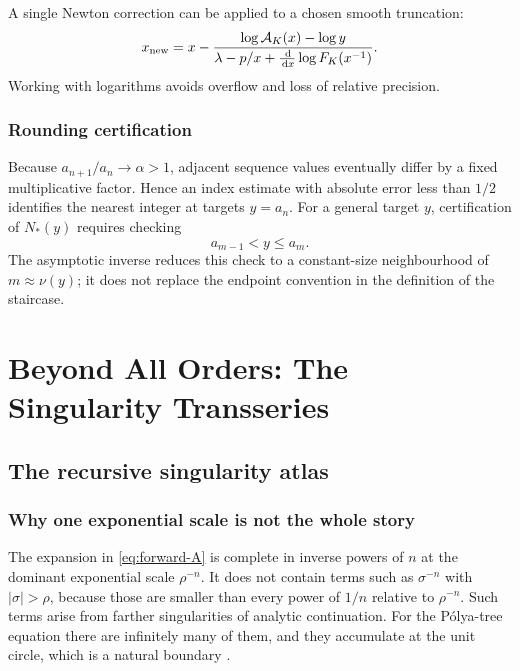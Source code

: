 \documentclass[11pt,a4paper,oneside,openany]{book}
\theoremstyle{definition}
\theoremstyle{remark}
\newcommand{\dd}{\,\mathrm d}
\begin{document}
A single Newton correction can be applied to a chosen smooth truncation:
\begin{equation}
 x_{\rm new}=x-
 \frac{\log\mathcal A_K(x)-\log y}
 {\lambda-p/x+\frac{\dd}{\dd x}\log F_K(x^{-1})}.
 \label{eq:inverse-newton}
\end{equation}
Working with logarithms avoids overflow and loss of relative precision.

\section{Rounding certification}
Because $a_{n+1}/a_n\to\alpha>1$, adjacent sequence values eventually differ by
a fixed multiplicative factor.  Hence an index estimate with absolute error
less than $1/2$ identifies the nearest integer at targets $y=a_n$.  For a
general target $y$, certification of $N_*(y)$ requires checking
\begin{equation}
 a_{m-1}<y\le a_m.
 \label{eq:inverse-certification}
\end{equation}
The asymptotic inverse reduces this check to a constant-size neighbourhood of
$m\approx\nu(y)$; it does not replace the endpoint convention in the definition
of the staircase.

\part{Beyond All Orders: The Singularity Transseries}

\chapter{The recursive singularity atlas}
\label{ch:atlas}

\section{Why one exponential scale is not the whole story}
The expansion in \cref{eq:forward-A} is complete in inverse powers of $n$ at
the dominant exponential scale $\rho^{-n}$.  It does not contain terms such as
$\sigma^{-n}$ with $|\sigma|>\rho$, because those are smaller than every power
of $1/n$ relative to $\rho^{-n}$.  Such terms arise from farther singularities
of analytic continuation.  For the P\'olya-tree equation there are infinitely
many of them, and they accumulate at the unit circle, which is a natural
boundary \cite{DrmotaGittenberger2010}.
\end{document}
